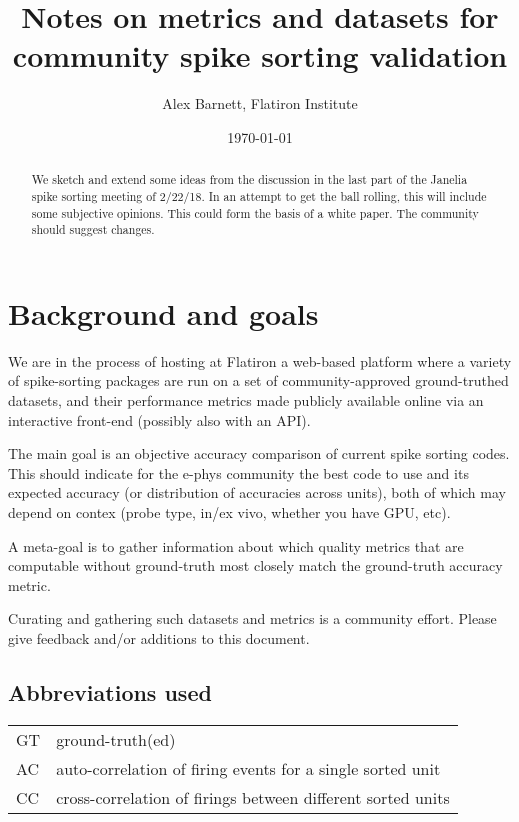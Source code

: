 \documentclass[10pt]{article}
\begin{document}
\title{Notes on metrics and datasets for community spike sorting validation}
\author{Alex Barnett, Flatiron Institute}
\date{\today}
\maketitle
\begin{abstract}
  We sketch and extend some ideas from the discussion in the last part of the
  Janelia spike sorting meeting of 2/22/18. In an attempt to get the ball rolling, this will include some
  subjective opinions. This could form the basis of a white paper.
  The community should suggest changes.
\end{abstract}

\section{Background and goals}

We are in the process of hosting at Flatiron a web-based platform where
a variety of spike-sorting packages are run on
a set of community-approved ground-truthed datasets, and their
performance metrics made publicly available online via an interactive
front-end (possibly also with an API).

The main goal is an objective accuracy comparison of current
spike sorting codes. This should indicate for the e-phys community
the best code to use and its expected accuracy (or distribution of
accuracies across units),
both of which may depend on contex (probe type, in/ex vivo, whether you have GPU, etc).

A meta-goal is to gather information about which quality metrics that
are computable without ground-truth most closely match the ground-truth
accuracy metric.

Curating and gathering such datasets and metrics is a community effort.
Please give feedback and/or additions to this document.


\subsection{Abbreviations used}

\begin{tabular}{ll}
GT & ground-truth(ed)\\
AC & auto-correlation of firing events for a single sorted unit\\
CC & cross-correlation of firings between different sorted units\\
\end{tabular}
\end{document}

